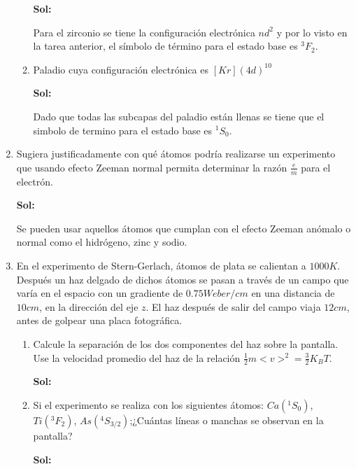 \documentclass[12pt,a4paper]{article}
\begin{document}
\begin{enumerate}
\begin{enumerate}
    \textbf{Sol:}
    
    Para el zirconio se tiene la configuración electrónica $nd^2$ y por lo visto en la tarea anterior, el símbolo de término para el estado base es $^{3}F_{2}$.
    
    \item Paladio cuya configuración electrónica es $[Kr](4d)^{10}$
    
    \textbf{Sol:}
    
    Dado que todas las subcapas del paladio están llenas se tiene que el simbolo de termino para el estado base es $^{1}S_{0}$.
\end{enumerate}






\item Sugiera justificadamente con qué átomos podría realizarse un experimento que usando efecto Zeeman normal permita determinar la razón $\frac{e}{m}$ para el electrón.

\textbf{Sol:}

Se pueden usar aquellos átomos que cumplan con el efecto Zeeman anómalo o normal como el hidrógeno, zinc y sodio.






\item En el experimento de Stern-Gerlach, átomos de plata se calientan a $1000K$. Después un haz delgado de dichos átomos se pasan a través de un campo que varía en el espacio con un gradiente de $0.75 Weber/cm$ en una distancia de $10cm$, en la dirección del eje $z$. El haz después de salir del campo viaja $12cm$, antes de golpear una placa fotográfica.

\begin{enumerate}
    \item Calcule la separación de los dos componentes del haz sobre la pantalla. Use la velocidad promedio del haz de la relación $\frac{1}{2}m <v>^2 = \frac{3}{2}K_{B}T$.
    
    \textbf{Sol:}
    
    
    \item Si el experimento se realiza con los siguientes átomos: $Ca(^{1}S_0)$, $Ti(^3F_2)$, $As(^4S_{3/2})$;¿Cuántas líneas o manchas se observan en la pantalla?
    
    \textbf{Sol:}
\end{enumerate}





\end{enumerate}
\end{document}
